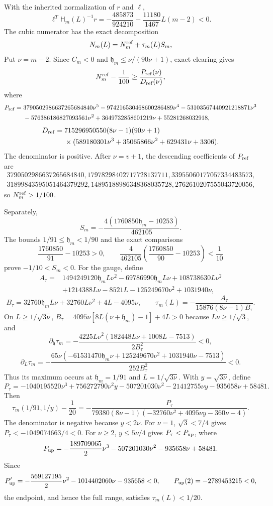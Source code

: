With the inherited normalization of $r$ and $\ell$,
\[
 \ell^T\mathsf H_m(L)^{-1}r
 =-\frac{485873}{924210}-\frac{11180}{1467}L(m-2)<0.
\]
The cubic numerator has the exact decomposition
\[
 N_m(L)=N_m^{\rm ref}+\tau_m(L)S_m,
\]
Put $\nu=m-2$.  Since $C_m<0$ and
$\mathfrak h_m\le\nu/(90\nu+1)$, exact clearing gives
\[
 N_m^{\rm ref}-\frac1{100}\ge\frac{P_{\rm ref}(\nu)}{D_{\rm ref}(\nu)},
\]
where
\begin{align*}
P_{\rm ref}={}&3790502986637265684840\nu^5
-974216530468600286489\nu^4-53103567440921218871\nu^3\\
&-576386186827093561\nu^2+3649732858601219\nu+55281268032918,
\end{align*}
\begin{align*}
D_{\rm ref}={}&715296950550(8\nu-1)(90\nu+1)\\
&\times(589180301\nu^3+35065866\nu^2+629431\nu+3306).
\end{align*}
The denominator is positive.  After $\nu=v+1$, the descending coefficients
of $P_{\rm ref}$ are
\[
\begin{gathered}
3790502986637265684840,17978298402717728137711,
33955060177057334483573,\\
31899843595051464379292,14895188986348368035728,
2762610207555043720056,
\end{gathered}
\]
so $N_m^{\rm ref}>1/100$.

Separately,
\[
 S_m=-\frac{4(1760850\mathfrak h_m-10253)}{462105}.
\]
The bounds $1/91\le\mathfrak h_m<1/90$ and the exact comparisons
\[
 \frac{1760850}{91}-10253>0,
 \qquad
 \frac4{462105}\left(\frac{1760850}{90}-10253\right)<\frac1{10}
\]
prove $-1/10<S_m<0$.  For the gauge, define
\begin{align*}
A_\tau={}&1494249120\mathfrak h_mL\nu^2-69786990\mathfrak h_mL\nu
+108738630L\nu^2\\
&+1214388L\nu-8521L-125249670\nu^2+1031940\nu,
\end{align*}
\[
B_\tau=32760\mathfrak h_mL\nu+32760L\nu^2+4L-4095\nu,
\qquad
\tau_m(L)=-\frac{A_\tau}{15876(8\nu-1)B_\tau}.
\]
On $L\ge1/\sqrt{3\nu}$,
$B_\tau=4095\nu[8L(\nu+\mathfrak h_m)-1]+4L>0$ because
$L\nu\ge1/\sqrt3$, and
\[
\partial_{\mathfrak h}\tau_m
=-\frac{4225L\nu^2(182448L\nu+1008L-7513)}{2B_\tau^2}<0,
\]
\[
\partial_L\tau_m
=-\frac{65\nu(-61531470\mathfrak h_m\nu+125249670\nu^2
+1031940\nu-7513)}{252B_\tau^2}<0.
\]
Thus its maximum occurs at $\mathfrak h_m=1/91$ and
$L=1/\sqrt{3\nu}$.  With $y=\sqrt{3\nu}$, define
\[
P_\tau=-1040195520\nu^3+756272790\nu^2y-507201030\nu^2
-21412755\nu y-935658\nu+58481.
\]
Then
\[
\tau_m(1/91,1/y)-\frac1{20}
=-\frac{P_\tau}{79380(8\nu-1)
(-32760\nu^2+4095\nu y-360\nu-4)}.
\]
The denominator is negative because $y<2\nu$.
For $\nu=1$, $\sqrt3<7/4$ gives
$P_\tau<-1049074663/4<0$.  For $\nu\ge2$, $y\le5\nu/4$ gives
$P_\tau<P_{\rm up}$, where
\[
P_{\rm up}=-\frac{189709065}{2}\nu^3-507201030\nu^2-935658\nu+58481.
\]
Since
\[
P_{\rm up}'=-\frac{569127195}{2}\nu^2-1014402060\nu-935658<0,
\qquad P_{\rm up}(2)=-2789453215<0,
\]
the endpoint, and hence the full range, satisfies $\tau_m(L)<1/20$.

